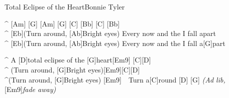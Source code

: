 \begin{song}{Total Eclipse of the Heart}{Bonnie Tyler}
\begin{guitar}
^ [Am] [G] [Am] [G] [C] [Bb] [C] [Bb]\\

^ [Eb](Turn around, [Ab]Bright eyes) Every now and the I fall apart\\
^ [Eb](Turn around, [Ab]Bright eyes) Every now and the I fall a[G]part\\
\end{guitar}




\begin{guitar}
^ A [D]total eclipse of the [G]heart[Em9] [C][D]\\
^ (Turn around, [G]Bright eyes)[Em9][C][D]\\
^(Turn around, [G]Bright eyes)   [Em9]\ \  Turn a[C]round [D]  [G] \emph{(Ad lib, }[Em9]\emph{fade away)}\\
\end{guitar}


\end{song}
